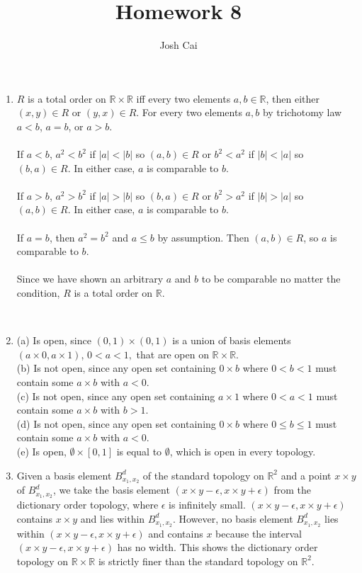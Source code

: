 \documentclass{article}
\begin{document}
\title{Homework 8}
\author{Josh Cai}

\maketitle
\begin{enumerate}
\item
$R$ is a total order on $\mathbb{R} \times \mathbb{R}$ iff every two elements $a,b \in \mathbb{R}$, then either $(x,y)\in R$ or $(y,x)\in R$. For every two elements $a,b$ by trichotomy law $a<b$, $a=b$, or $a>b$.
\\\\ If $a<b$, $a^2<b^2$ if $|a|<|b|$ so $(a,b) \in R$ or $b^2<a^2$ if $|b|<|a|$ so $(b,a) \in R$. In either case, $a$ is comparable to $b$.
\\\\ If $a>b$, $a^2>b^2$ if $|a|>|b|$ so $(b,a) \in R$ or $b^2>a^2$ if $|b|>|a|$ so $(a,b) \in R$. In either case, $a$ is comparable to $b$.
\\\\ If $a=b$, then $a^2=b^2$ and $a \le b$ by assumption. Then $(a,b) \in R$, so $a$ is comparable to $b$.
\\\\Since we have shown an arbitrary $a$ and $b$ to be comparable no matter the condition, $R$ is a total order on $\mathbb{R}$.
\addtocounter{enumi}{2}
\\\item (a) Is open, since $(0,1) \times (0,1)$ is a union of basis elements $(a\times 0, a\times 1)$, $0<a<1,$ that are open on $\mathbb{R}\times\mathbb{R}$.
\\(b) Is not open, since any open set containing $0 \times b$ where $0<b<1$ must contain some $a \times b$ with $a<0$.
\\(c) Is not open, since any open set containing $a \times 1$ where $0<a<1$ must contain some $a \times b$ with $b>1$.
\\(d) Is not open, since any open set containing $0 \times b$ where $0\le b\le 1$ must contain some $a \times b$ with $a<0$.
\\(e) Is open, $\emptyset \times [0,1]$ is equal to $\emptyset$, which is open in every topology.
\\\item 
Given a basis element $B_{x_1,x_2}^d$ of the standard topology on $\mathbb{R}^2$ and a point $x \times y$ of $B_{x_1,x_2}^d$, we take the basis element $(x\times y-\epsilon, x\times y+\epsilon)$ from the dictionary order topology, where $\epsilon$ is infinitely small. $(x\times y-\epsilon, x\times y+\epsilon)$ contains $x \times y$ and lies within $B_{x_1,x_2}^d$. However, no basis element $B_{x_1,x_2}^d$ lies within $(x\times y-\epsilon, x\times y+\epsilon)$ and contains $x$ because the interval $(x\times y-\epsilon, x\times y+\epsilon)$ has no width. This shows the dictionary order topology on $\mathbb{R}\times\mathbb{R}$ is strictly finer than the standard topology on $\mathbb{R}^2$.

\end{enumerate}
\end{document}
